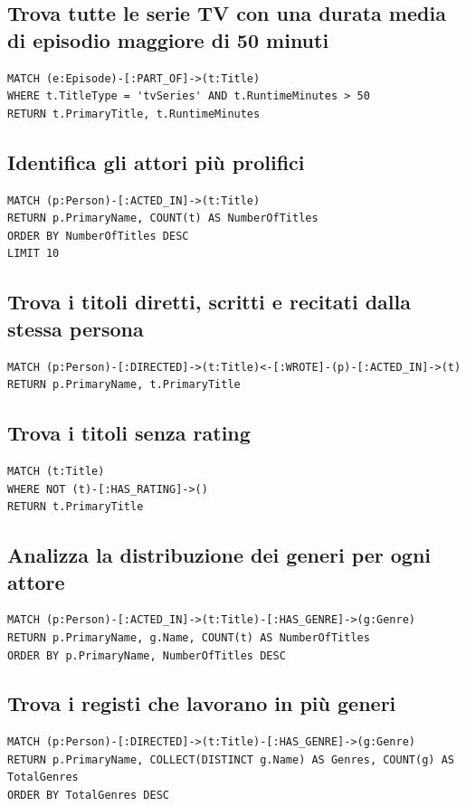 \documentclass[a4paper,12pt]{article}
\begin{document}
\subsection{Trova tutte le serie TV con una durata media di episodio maggiore di 50 minuti}
\begin{verbatim}
MATCH (e:Episode)-[:PART_OF]->(t:Title)
WHERE t.TitleType = 'tvSeries' AND t.RuntimeMinutes > 50
RETURN t.PrimaryTitle, t.RuntimeMinutes
\end{verbatim}

\subsection{Identifica gli attori più prolifici}
\begin{verbatim}
MATCH (p:Person)-[:ACTED_IN]->(t:Title)
RETURN p.PrimaryName, COUNT(t) AS NumberOfTitles
ORDER BY NumberOfTitles DESC
LIMIT 10
\end{verbatim}

\subsection{Trova i titoli diretti, scritti e recitati dalla stessa persona}
\begin{verbatim}
MATCH (p:Person)-[:DIRECTED]->(t:Title)<-[:WROTE]-(p)-[:ACTED_IN]->(t)
RETURN p.PrimaryName, t.PrimaryTitle
\end{verbatim}

\subsection{Trova i titoli senza rating}
\begin{verbatim}
MATCH (t:Title)
WHERE NOT (t)-[:HAS_RATING]->()
RETURN t.PrimaryTitle
\end{verbatim}

\subsection{Analizza la distribuzione dei generi per ogni attore}
\begin{verbatim}
MATCH (p:Person)-[:ACTED_IN]->(t:Title)-[:HAS_GENRE]->(g:Genre)
RETURN p.PrimaryName, g.Name, COUNT(t) AS NumberOfTitles
ORDER BY p.PrimaryName, NumberOfTitles DESC
\end{verbatim}

\subsection{Trova i registi che lavorano in più generi}
\begin{verbatim}
MATCH (p:Person)-[:DIRECTED]->(t:Title)-[:HAS_GENRE]->(g:Genre)
RETURN p.PrimaryName, COLLECT(DISTINCT g.Name) AS Genres, COUNT(g) AS TotalGenres
ORDER BY TotalGenres DESC
\end{verbatim}
\end{document}
